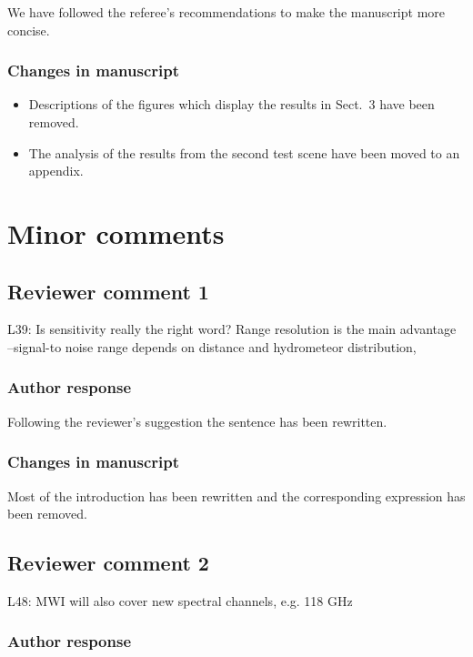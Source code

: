 We have followed  the referee's recommendations to make the manuscript more
concise.

\subsubsection*{Changes in manuscript}

\begin{itemize}
\item Descriptions of the figures which display the results in Sect.~3 have
  been removed.
\item The analysis of the results from the second test scene have been
  moved to an appendix.
\end{itemize}

\section{Minor comments}
\subsection*{Reviewer comment 1}

L39: Is sensitivity really the right word? Range resolution is the main
advantage –signal-to noise range depends on distance and hydrometeor
distribution,

\subsubsection*{Author response}

Following the reviewer's suggestion the sentence has been rewritten.

\subsubsection*{Changes in manuscript}

Most of the introduction has been rewritten and the corresponding
expression has been removed.

\subsection*{Reviewer comment 2}

L48: MWI will also cover new spectral channels, e.g. 118 GHz

\subsubsection*{Author response}

